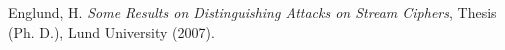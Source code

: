\begin{thebibliography}{99}
		Englund, H. \emph{Some Results on Distinguishing Attacks
		on Stream Ciphers}, Thesis (Ph. D.), Lund University (2007).
    
\end{thebibliography}
